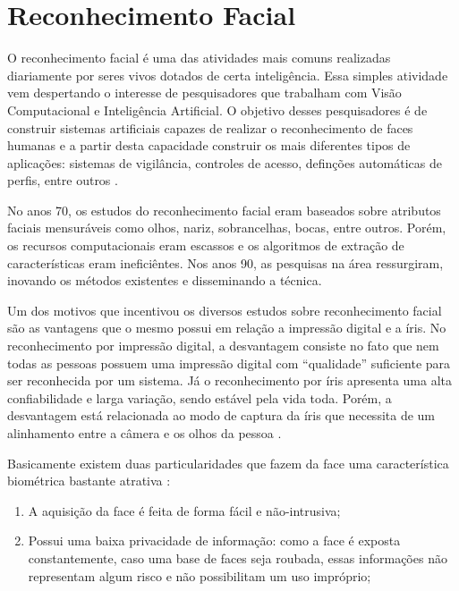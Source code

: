 \section{Reconhecimento Facial}

O reconhecimento facial é uma das atividades mais comuns realizadas diariamente por seres vivos dotados de certa inteligência. Essa simples atividade vem despertando o interesse de pesquisadores que trabalham com Visão Computacional e Inteligência Artificial. O objetivo desses pesquisadores é de construir sistemas artificiais capazes de realizar o reconhecimento de faces humanas e a partir desta capacidade construir os mais diferentes tipos de aplicações: sistemas de vigilância, controles de acesso, definções automáticas de perfis, entre outros \cite{oliveira}.

No anos 70, os estudos do reconhecimento facial eram baseados sobre atributos faciais mensuráveis como olhos, nariz, sobrancelhas, bocas, entre outros. Porém, os recursos computacionais eram escassos e os algoritmos de extração de características eram ineficiêntes. Nos anos 90, as pesquisas na área ressurgiram, inovando os métodos existentes \cite{hong, saocarlos} e disseminando a técnica.

Um dos motivos que incentivou os diversos estudos sobre reconhecimento facial são as vantagens que o mesmo possui em relação a impressão digital e a íris.  No reconhecimento por impressão digital, a desvantagem consiste no fato que nem todas as pessoas possuem uma impressão digital com ``qualidade'' suficiente para ser reconhecida por um sistema. Já o reconhecimento por íris apresenta uma alta confiabilidade e larga variação, sendo estável pela vida toda. Porém, a desvantagem está relacionada ao modo de captura da íris que necessita de um alinhamento entre a câmera e os olhos da pessoa \cite{saocarlos}. 

Basicamente existem duas particularidades que fazem da face uma característica biométrica bastante atrativa \cite{drovetto}:

	\begin{enumerate}
		\item A aquisição da face é feita de forma fácil e não-intrusiva;
		\item Possui uma baixa privacidade de informação: como a face é exposta constantemente, caso uma base de faces seja roubada, essas informações não representam algum risco e não possibilitam um uso impróprio;
	\end{enumerate}

